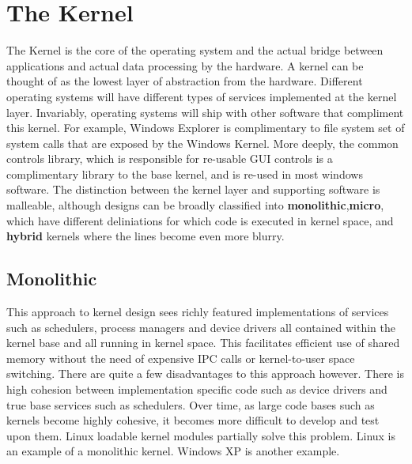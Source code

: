 \documentclass[10pt,a4paper]{article}
\begin{document}
\section{The Kernel}
The Kernel is the core of the operating system and the actual bridge between applications and actual data processing by the hardware. A kernel can be thought of as the lowest layer of abstraction from the hardware. Different operating systems will have different types of services implemented at the kernel layer. Invariably, operating systems will ship with other software that compliment this kernel. For example, Windows Explorer is complimentary to file system set of system calls that are exposed by the Windows Kernel. More deeply, the common controls library, which is responsible for re-usable GUI controls is a complimentary library to the base kernel, and is re-used in most windows software. The distinction between the kernel layer and supporting software is malleable, although designs can be broadly classified into {\bf monolithic},{\bf micro}, which have different deliniations for which code is executed in kernel space, and {\bf hybrid} kernels where the lines become even more blurry. 
\subsection{Monolithic}
This approach to kernel design sees richly featured implementations of services such as schedulers, process managers and device drivers all contained within the kernel base and all running in kernel space. This facilitates efficient use of shared memory without the need of expensive IPC calls or kernel-to-user space switching. There are quite a few disadvantages to this approach however. There is high cohesion between implementation specific code such as device drivers and true base services such as schedulers. Over time, as large code bases such as kernels become highly cohesive, it becomes more difficult to develop and test upon them. Linux loadable kernel modules partially solve this problem. Linux is an example of a monolithic kernel. Windows XP is another example. 
\end{document}
